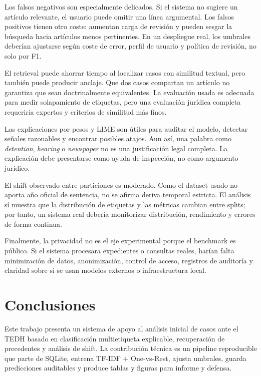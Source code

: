 \documentclass[11pt,a4paper]{article}
\begin{document}
Los falsos negativos son especialmente delicados. Si el sistema no sugiere un artículo relevante, el usuario puede omitir una línea argumental. Los falsos positivos tienen otro coste: aumentan carga de revisión y pueden sesgar la búsqueda hacia artículos menos pertinentes. En un despliegue real, los umbrales deberían ajustarse según coste de error, perfil de usuario y política de revisión, no solo por F1.

El retrieval puede ahorrar tiempo al localizar casos con similitud textual, pero también puede producir anclaje. Que dos casos compartan un artículo no garantiza que sean doctrinalmente equivalentes. La evaluación usada es adecuada para medir solapamiento de etiquetas, pero una evaluación jurídica completa requeriría expertos y criterios de similitud más finos.

Las explicaciones por pesos y LIME son útiles para auditar el modelo, detectar señales razonables y encontrar posibles atajos. Aun así, una palabra como \textit{detention}, \textit{hearing} o \textit{newspaper} no es una justificación legal completa. La explicación debe presentarse como ayuda de inspección, no como argumento jurídico.

El shift observado entre particiones es moderado. Como el dataset usado no aporta año oficial de sentencia, no se afirma deriva temporal estricta. El análisis sí muestra que la distribución de etiquetas y las métricas cambian entre splits; por tanto, un sistema real debería monitorizar distribución, rendimiento y errores de forma continua.

Finalmente, la privacidad no es el eje experimental porque el benchmark es público. Si el sistema procesara expedientes o consultas reales, harían falta minimización de datos, anonimización, control de acceso, registros de auditoría y claridad sobre si se usan modelos externos o infraestructura local.

\section{Conclusiones}
\label{sec:conclusiones}

Este trabajo presenta un sistema de apoyo al análisis inicial de casos ante el TEDH basado en clasificación multietiqueta explicable, recuperación de precedentes y análisis de shift. La contribución técnica es un pipeline reproducible que parte de SQLite, entrena TF-IDF + One-vs-Rest, ajusta umbrales, guarda predicciones auditables y produce tablas y figuras para informe y defensa.
\end{document}
